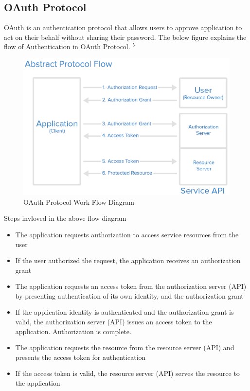 \documentclass[12pt]{report}
\begin{document}
\subsection{OAuth Protocol}
OAuth is an authentication protocol that allows users to approve application to act on their behalf without sharing their password.
The below figure explains the flow of Authentication in OAuth Protocol. $ ^{5}$
\begin{figure}[H]
\begin{center}
\includegraphics[scale=0.5]{abstract_flow}
\caption{OAuth Protocol Work Flow Diagram\label{fig:OAuth Protocol Work Flow Diagram}}
\end{center}
\end{figure}
Steps invloved in the above flow diagram
\begin{itemize}
\item The application requests authorization to access service resources from the user
\item If the user authorized the request, the application receives an authorization grant
\item The application requests an access token from the authorization server (API) by presenting authentication of its own identity, and the authorization grant
\item If the application identity is authenticated and the authorization grant is valid, the authorization server (API) issues an access token to the application. Authorization is complete.
\item The application requests the resource from the resource server (API) and presents the access token for authentication
\item If the access token is valid, the resource server (API) serves the resource to the application
\end{itemize}
\end{document}
